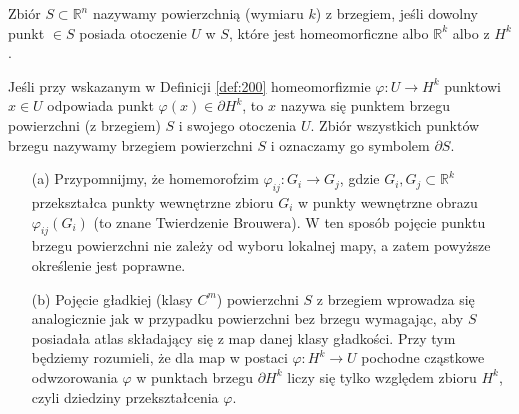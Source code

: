\documentclass[leqno]{article}
\newcounter{defcounter}
\newcounter{uwagacounter}
\begin{document}
\begin{justify}
\newpage

\setcounter{defcounter}{199}
\setcounter{uwagacounter}{104}

\begin{defn}
    Zbiór $S \subset \mathbb{R}^n$ nazywamy powierzchnią (wymiaru $k$) z brzegiem, jeśli dowolny punkt $ \in S$ posiada otoczenie $U$ w $S$,
    które jest homeomorficzne albo $\mathbb{R}^k$ albo z $H^k$. 
\end{defn}

\begin{defn}
    Jeśli przy wskazanym w Definicji \ref{def:200} homeomorfizmie $\varphi : U \to H^k$ punktowi $x \in U$ odpowiada punkt $\varphi(x) \in \partial H^k$, to 
    $x$ nazywa się punktem brzegu powierzchni (z brzegiem) $S$ i swojego otoczenia $U$. Zbiór wszystkich punktów brzegu nazywamy brzegiem powierzchni $S$ 
    i oznaczamy go symbolem $\partial S$. 
\end{defn}

\begin{uwaga}
    \begin{itemize}
        \item [(a)] Przypomnijmy, że homemorofzim $\varphi_{ij} : G_i \to G_j$, gdzie $G_i, G_j \subset \mathbb{R}^k$ przekształca 
            punkty wewnętrzne zbioru $G_i$ w punkty wewnętrzne obrazu $\varphi_{ij}(G_i)$ (to znane Twierdzenie Brouwera). 
            W ten sposób pojęcie punktu brzegu powierzchni nie zależy od wyboru lokalnej mapy, a zatem powyższe określenie jest poprawne. 
        \item [(b)]
            Pojęcie gładkiej (klasy $C^m$) powierzchni $S$ z brzegiem wprowadza się analogicznie jak w przypadku powierzchni bez brzegu wymagając, aby $S$
            posiadała atlas składający się z map danej klasy gładkości. Przy tym będziemy rozumieli, że dla map w postaci $\varphi : H^k \to U$
            pochodne cząstkowe odwzorowania $\varphi$ w punktach brzegu $\partial H^k$ liczy się tylko względem zbioru $H^k$, czyli dziedziny przekształcenia $\varphi$. 
    \end{itemize}
\end{uwaga}



\end{justify}
\end{document}
